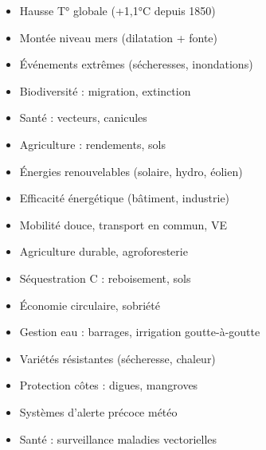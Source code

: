 \documentclass[11pt]{article}
\begin{document}
\begin{popfigure}
\begin{tcbraster}[raster columns=3,raster equal height=rows,raster column skip=6pt,raster row skip=6pt,enhanced,blankest]
\begin{tcolorbox}
\begin{itemize}[nosep,leftmargin=*,itemsep=1pt,font=\scriptsize]
\item Hausse T° globale (+1,1°C depuis 1850)
\item Mont\'ee niveau mers (dilatation + fonte)
\item \'Ev\'enements extr\^emes (s\'echeresses, inondations)
\item Biodiversit\'e : migration, extinction
\item Sant\'e : vecteurs, canicules
\item Agriculture : rendements, sols
\end{itemize}
\end{tcolorbox}
\begin{tcolorbox}[enhanced,colback=white,colframe=poppurple,boxrule=0.9pt,arc=3pt,title={4. Att\'enuation (r\'eduire causes)},fonttitle=\bfseries\scriptsize,coltitle=white,colbacktitle=poppurple,left=4pt,right=4pt,top=2pt,bottom=2pt,boxsep=1pt,toptitle=1.5pt,bottomtitle=1.5pt,halign=left]
\begin{itemize}[nosep,leftmargin=*,itemsep=1pt,font=\scriptsize]
\item \'Energies renouvelables (solaire, hydro, \'eolien)
\item Efficacit\'e \'energ\'etique (b\^atiment, industrie)
\item Mobilit\'e douce, transport en commun, VE
\item Agriculture durable, agroforesterie
\item S\'equestration C : reboisement, sols
\item \'Economie circulaire, sobri\'et\'e
\end{itemize}
\end{tcolorbox}
\begin{tcolorbox}[enhanced,colback=white,colframe=poppink,boxrule=0.9pt,arc=3pt,title={5. Adaptation (g\'erer effets)},fonttitle=\bfseries\scriptsize,coltitle=white,colbacktitle=poppink,left=4pt,right=4pt,top=2pt,bottom=2pt,boxsep=1pt,toptitle=1.5pt,bottomtitle=1.5pt,halign=left]
\begin{itemize}[nosep,leftmargin=*,itemsep=1pt,font=\scriptsize]
\item Gestion eau : barrages, irrigation goutte-\`a-goutte
\item Vari\'et\'es r\'esistantes (s\'echeresse, chaleur)
\item Protection c\^otes : digues, mangroves
\item Syst\`emes d'alerte pr\'ecoce m\'et\'eo
\item Sant\'e : surveillance maladies vectorielles

\end{itemize}
\end{tcolorbox}
\end{tcbraster}
\end{popfigure}
\end{document}
